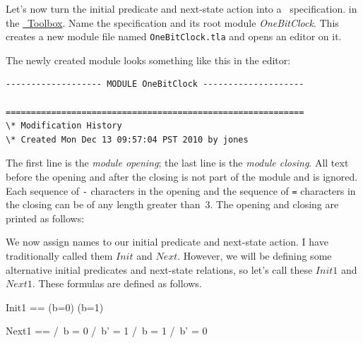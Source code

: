 Let's now turn the initial predicate and next-state action into a
\tlaplus\ specification.  
in the 
 \hyperref{http://research.microsoft.com/en-us/um/people/lamport/tla/toolbox.html}{}{}{\protect\tlaplus\
Toolbox}.
Name the specification and
its root module \emph{OneBitClock}.  This creates a new module file
named \texttt{OneBitClock.tla} and opens an editor on it.

The newly created module looks something like this in the editor:
\begin{display}
\begin{verbatim}
------------------- MODULE OneBitClock --------------------

===========================================================
\* Modification History
\* Created Mon Dec 13 09:57:04 PST 2010 by jones
\end{verbatim}
\end{display}
The first line is the 
\emph{module opening}; the last line is the
\emph{module closing}.  All text before the opening and after the
closing is not part of the module and is ignored.  Each sequence of
\verb|-| characters in the opening and the sequence of \verb|=|
characters in the closing can be of any length greater than~3.  
The opening and closing are printed as follows:
\begin{display}
\end{display}
We now assign names to our initial predicate and next-state action.  I
have traditionally called them $Init$ and $Next$.  However, we will be
defining some alternative initial predicates and next-state relations,
so let's call these $Init1$ and $Next1$.  These formulas are defined
as follows.
\begin{display}
\begin{notla}
Init1 == (b=0) \/ (b=1)
     
Next1 == \/ /\ b = 0
            /\ b' = 1
         \/ /\ b = 1
            /\ b' = 0
\end{notla}
\begin{tlatex}
%
\par\vspace{8.0pt}%
%
%
%
%
%
\end{tlatex}
\end{display}

